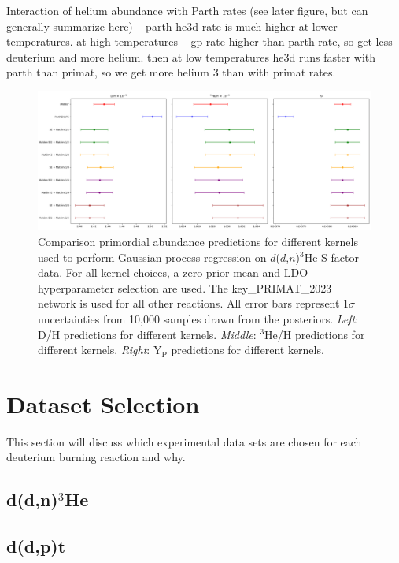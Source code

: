 \documentclass[%
 reprint,
superscriptaddress,
nofootinbib,
 amsmath,amssymb,
 aps,
 pra,
]{revtex4-2}
\begin{document}
Interaction of helium abundance with Parth rates (see later figure, but can generally summarize here) -- parth he3d rate is much higher at lower temperatures. at high temperatures -- gp rate higher than parth rate, so get less deuterium and more helium. then at low temperatures he3d runs faster with parth than primat, so we get more helium 3 than with primat rates.

\begin{figure}
	\centering
	\includegraphics[width=0.98\linewidth]{Figures/ddhe3n_kernel_comp.png}
	\caption{Comparison primordial abundance predictions for different kernels used to perform Gaussian process regression on $d$($d$,$n$)$^3$He S-factor data.  For all kernel choices, a zero prior mean and LDO hyperparameter selection are used. The key\_PRIMAT\_2023 network is used for all other reactions. All error bars represent $1\sigma$ uncertainties from 10,000 samples drawn from the posteriors. \textit{Left}: D/H predictions for different kernels. \textit{Middle}: $^3$He/H predictions for different kernels. \textit{Right}: Y$_\text{P}$ predictions for different kernels. }
\end{figure}



\section{Dataset Selection}



This section will discuss which experimental data sets are chosen for each deuterium burning reaction and why. 

\subsection{d(d,n)$^3$He}

\subsection{d(d,p)t}
\end{document}
